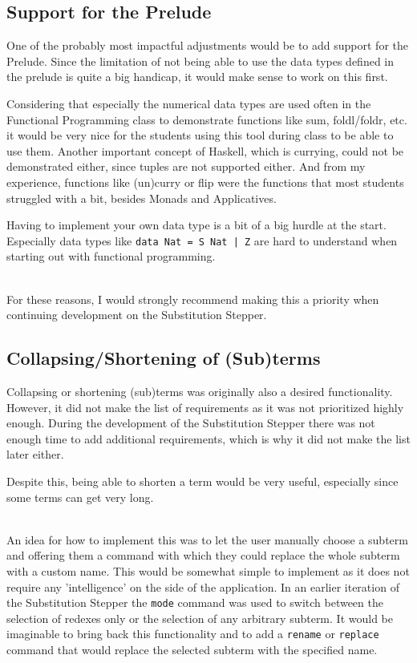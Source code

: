 \subsection{Support for the Prelude}
One of the probably most impactful adjustments would be to add support for the Prelude.
Since the limitation of not being able to use the data types defined in the prelude is quite a big handicap,
it would make sense to work on this first.

Considering that especially the numerical data types are used often in the Functional Programming class to demonstrate functions like sum, foldl/foldr, etc.
it would be very nice for the students using this tool during class to be able to use them.
Another important concept of Haskell, which is currying, could not be demonstrated either,
since tuples are not supported either.
And from my experience, functions like (un)curry or flip were the functions that most students struggled with a bit, besides Monads and Applicatives.

Having to implement your own data type is a bit of a big hurdle at the start.
Especially data types like \texttt{data Nat = S Nat | Z} are hard to understand when starting out with functional programming.

\ \\
For these reasons,
I would strongly recommend making this a priority when continuing development on the Substitution Stepper.


\subsection{Collapsing/Shortening of (Sub)terms}
Collapsing or shortening (sub)terms was originally also a desired functionality.
However, it did not make the list of requirements as it was not prioritized highly enough.
During the development of the Substitution Stepper there was not enough time to add additional requirements,
which is why it did not make the list later either.

Despite this,
being able to shorten a term would be very useful,
especially since some terms can get very long.

\ \\
An idea for how to implement this was to let the user manually choose a subterm and offering them a command with which they could replace the whole subterm with a custom name.
This would be somewhat simple to implement as it does not require any 'intelligence' on the side of the application.
In an earlier iteration of the Substitution Stepper the \texttt{mode} command was used to switch between the selection of redexes only or the selection of any arbitrary subterm.
It would be imaginable to bring back this functionality and to add a \texttt{rename} or \texttt{replace} command that would replace the selected subterm with the specified name.

